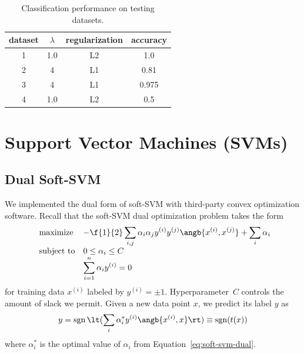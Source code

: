 \documentclass{article}
\DeclareMathOperator{\sgn}{sgn}
\newcommand{\sind}[1]{^{(#1)}}
\begin{document}
\begin{multicols}{2}
\begin{table}
    \caption{Classification performance on testing datasets.}
    \centering
    \begin{tabular}{|c||c|c|c|}
        \hline
        dataset & $\lambda$	& regularization		 & accuracy \\\hline
        1	&  1.0 & L2 & 1.0\\
        2	& 4 & L1 & 0.81 \\
        3	& 4 & L1 & 0.975 \\
        4	& 1.0 & L2 & 0.5 \\\hline
    \end{tabular}
    \label{table:1-3-optimal}
\end{table}


\section{Support Vector Machines (SVMs)}
\label{sec:svm}

\subsection{Dual Soft-SVM}

We implemented the dual form of soft-SVM
with third-party convex optimization software.
Recall that the soft-SVM dual optimization problem takes the form
\begin{equation}
    \label{eq:soft-svm-dual}
    \begin{array}{ll@{}ll}
        \text{maximize}  &\displaystyle -\f{1}{2}\sum_{i,j} \alpha_i \alpha_j y\sind{i} y\sind{j} \angb{x\sind{i}, x\sind{j}}
        +
        \sum_i \alpha_i \\
        \text{subject to}& 0 \le \alpha_i \le C\\
        & \displaystyle\sum_{i=1}^n \alpha_i y\sind{i} = 0
    \end{array}
\end{equation}
for training data $x\sind{i}$
labeled by $y\sind i = \pm 1$.
Hyperparameter~$C$ controls the amount of slack we permit.
Given a new data point $x$,
we predict its label $y$ as
\begin{equation}
    \label{eq:soft-svm-predict}
    y = \sgn\lt(\sum_i \alpha^*_i y\sind{i} \angb{x\sind{i}, x}\rt) \equiv \sgn(t(x))
\end{equation}
where $\alpha^*_i$ is the optimal value of $\alpha_i$
from Equation~\ref{eq:soft-svm-dual}.


\end{multicols}
\end{document}
